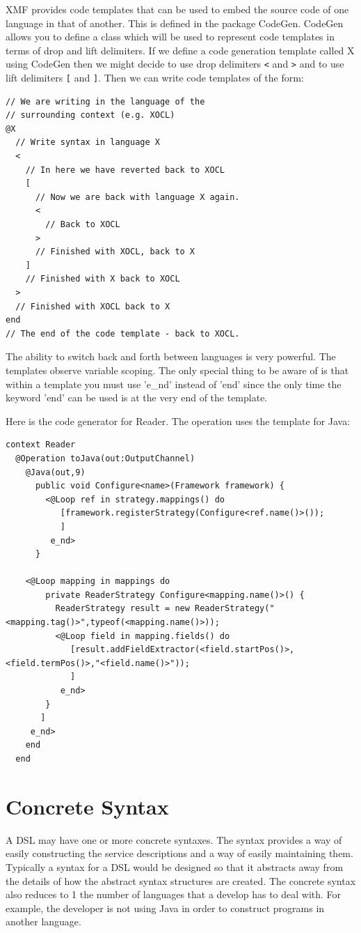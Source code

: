 XMF provides code templates that can be used to embed the source code 
of one language in that of another. This is defined in the package CodeGen. 
CodeGen allows you to define a class which will be used to represent code 
templates in terms of drop and lift delimiters. If we define a code 
generation template called X using CodeGen then we might decide to use 
drop delimiters {\tt <} and {\tt >} and to use lift delimiters {\tt [} and {\tt ]}. 
Then we can write code templates of the form:
\begin{lstlisting}
// We are writing in the language of the
// surrounding context (e.g. XOCL)
@X
  // Write syntax in language X
  <
    // In here we have reverted back to XOCL
    [ 
      // Now we are back with language X again.
      < 
        // Back to XOCL
      >
      // Finished with XOCL, back to X
    ]
    // Finished with X back to XOCL
  >
  // Finished with XOCL back to X
end
// The end of the code template - back to XOCL.
\end{lstlisting}
The ability to switch back and forth between languages is very powerful. 
The templates observe variable scoping. The only special thing to be aware 
of is that within a template you must use 'e\_nd' instead of 'end' since the 
only time the keyword 'end' can be used is at the very end of the template.

Here is the code generator for Reader. The operation uses the template for Java:
\begin{lstlisting}
context Reader
  @Operation toJava(out:OutputChannel)
    @Java(out,9)
      public void Configure<name>(Framework framework) { 
        <@Loop ref in strategy.mappings() do 
           [framework.registerStrategy(Configure<ref.name()>()); 
           ] 
         e_nd>
      }

    <@Loop mapping in mappings do
        private ReaderStrategy Configure<mapping.name()>() {
          ReaderStrategy result = new ReaderStrategy("<mapping.tag()>",typeof(<mapping.name()>));
          <@Loop field in mapping.fields() do
             [result.addFieldExtractor(<field.startPos()>,<field.termPos()>,"<field.name()>"));
             ]
           e_nd>
        }
       ]
     e_nd>
    end
  end
\end{lstlisting}

\section{Concrete Syntax}

A DSL may have one or more concrete syntaxes. The syntax provides a way 
of easily constructing the service descriptions and a way of easily 
maintaining them. Typically a syntax for a DSL would be designed so 
that it abstracts away from the details of how the abstract syntax 
structures are created. The concrete syntax also reduces to 1 the 
number of languages that a develop has to deal with. For example, 
the developer is not using Java in order to construct programs in 
another language.

